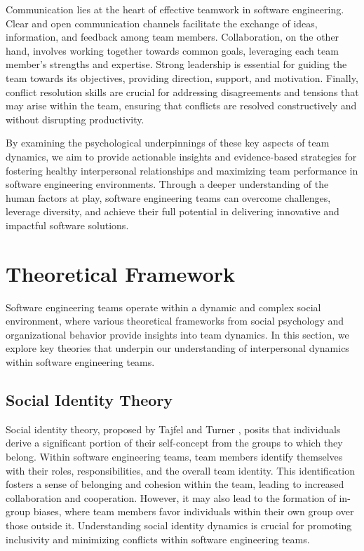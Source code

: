 \documentclass{article}
\begin{document}
Communication lies at the heart of effective teamwork in software engineering. Clear and open communication channels facilitate the exchange of ideas, information, and feedback among team members. Collaboration, on the other hand, involves working together towards common goals, leveraging each team member's strengths and expertise. Strong leadership is essential for guiding the team towards its objectives, providing direction, support, and motivation. Finally, conflict resolution skills are crucial for addressing disagreements and tensions that may arise within the team, ensuring that conflicts are resolved constructively and without disrupting productivity.

By examining the psychological underpinnings of these key aspects of team dynamics, we aim to provide actionable insights and evidence-based strategies for fostering healthy interpersonal relationships and maximizing team performance in software engineering environments. Through a deeper understanding of the human factors at play, software engineering teams can overcome challenges, leverage diversity, and achieve their full potential in delivering innovative and impactful software solutions.


\section{Theoretical Framework}
Software engineering teams operate within a dynamic and complex social environment, where various theoretical frameworks from social psychology and organizational behavior provide insights into team dynamics. In this section, we explore key theories that underpin our understanding of interpersonal dynamics within software engineering teams.

\subsection{Social Identity Theory}
Social identity theory, proposed by Tajfel and Turner \cite{TajfelTurner1986}, posits that individuals derive a significant portion of their self-concept from the groups to which they belong. Within software engineering teams, team members identify themselves with their roles, responsibilities, and the overall team identity. This identification fosters a sense of belonging and cohesion within the team, leading to increased collaboration and cooperation. However, it may also lead to the formation of in-group biases, where team members favor individuals within their own group over those outside it. Understanding social identity dynamics is crucial for promoting inclusivity and minimizing conflicts within software engineering teams.
\end{document}

